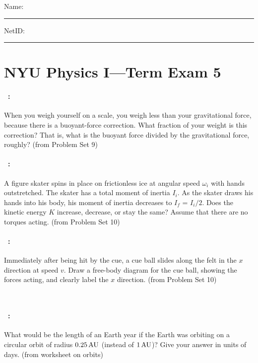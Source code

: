 \documentclass[12pt]{article} 
\begin{document}
\noindent
Name: \rule[-1ex]{0.55\textwidth}{0.1pt}
NetID: \rule[-1ex]{0.2\textwidth}{0.1pt}

\section*{NYU Physics I---Term Exam 5}

\paragraph{\problemname~\theproblem:}%
When you weigh yourself on a scale, you weigh less than your
gravitational force, because there is a buoyant-force correction. What
fraction of your weight is this correction? That is, what is the
buoyant force divided by the gravitational force, roughly?
(from Problem Set 9)

\vfill

\paragraph{\problemname~\theproblem:}%
A figure skater spins in place on frictionless ice at angular speed
$\omega_i$ with hands outstretched. The skater has a total moment of inertia
$I_i$. As the skater draws his hands into his body, his moment of
inertia decreases to $I_f$ = $I_i/2$. Does the kinetic energy $K$
increase, decrease, or stay the same? Assume that there are no torques
acting.
(from Problem Set 10)

\vfill

\paragraph{\problemname~\theproblem:}%
Immediately after being hit by the cue, a cue ball slides along the
felt in the $x$ direction at speed $v$. Draw a free-body diagram for
the cue ball, showing the forces acting, and clearly label the $x$
direction.
(from Problem Set 10)

\vfill
~
\clearpage

\paragraph{\problemname~\theproblem:}%
What would be the length of an Earth year if the Earth was orbiting
on a circular orbit of radius $0.25\,\mathrm{AU}$ (instead of $1\,\mathrm{AU}$)?
Give your answer in units of days.
(from worksheet on orbits)
\end{document}
